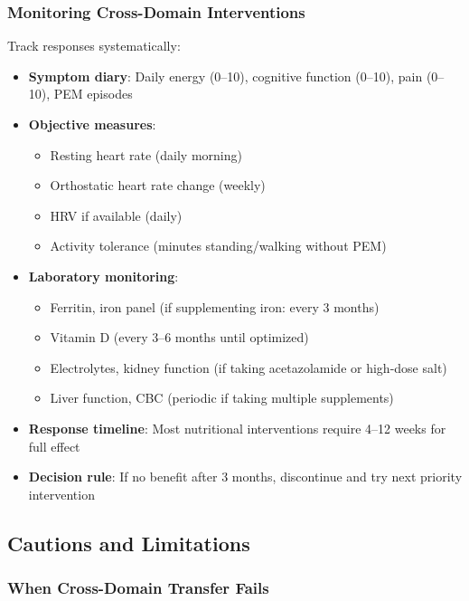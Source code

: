 \subsubsection{Monitoring Cross-Domain Interventions}

Track responses systematically:

\begin{itemize}
    \item \textbf{Symptom diary}: Daily energy (0--10), cognitive function (0--10), pain (0--10), PEM episodes
    \item \textbf{Objective measures}:
    \begin{itemize}
        \item Resting heart rate (daily morning)
        \item Orthostatic heart rate change (weekly)
        \item HRV if available (daily)
        \item Activity tolerance (minutes standing/walking without PEM)
    \end{itemize}
    \item \textbf{Laboratory monitoring}:
    \begin{itemize}
        \item Ferritin, iron panel (if supplementing iron: every 3 months)
        \item Vitamin D (every 3--6 months until optimized)
        \item Electrolytes, kidney function (if taking acetazolamide or high-dose salt)
        \item Liver function, CBC (periodic if taking multiple supplements)
    \end{itemize}
    \item \textbf{Response timeline}: Most nutritional interventions require 4--12 weeks for full effect
    \item \textbf{Decision rule}: If no benefit after 3 months, discontinue and try next priority intervention
\end{itemize}

\subsection{Cautions and Limitations}
\label{subsec:cross-domain-limitations}

\subsubsection{When Cross-Domain Transfer Fails}

